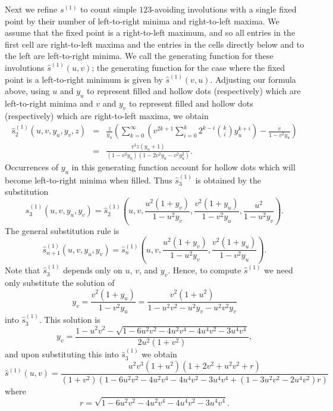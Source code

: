 \documentclass[10pt]{article}
\theoremstyle{plain}
\begin{document}
Next we refine $s^{(1)}$ to count simple $123$-avoiding involutions with a single fixed point by their number of left-to-right minima and right-to-left maxima. We assume that the fixed point is a right-to-left maximum, and so all entries in the first cell are right-to-left maxima and the entries in the cells directly below and to the left are left-to-right minima. We call the generating function for these involutions $\widehat{s}^{(1)}(u,v)$; the generating function for the case where the fixed point is a left-to-right minimum is given by $\widehat{s}^{(1)}(v,u)$. Adjusting our formula above, using $u$ and $y_u$ to represent filled and hollow dots (respectively) which are left-to-right minima and $v$ and $y_v$ to represent filled and hollow dots (respectively) which are right-to-left maxima, we obtain 
	\begin{eqnarray*}
	\widehat{s}_2^{(1)}(u,v,y_u,y_v,z)
	&=&
	\frac{z}{y_u}\left(\sum_{k=0}^\infty \left(v^{2k+1}\sum_{i=0}^k 2^{k-i}{k\choose i}y_u^{k+i}\right) - \frac{v}{1-v^2y_u}\right)\\
	&=&
	\frac{v^3z(y_u+1)}{(1-v^2y_u)(1-2v^2y_u-v^2y_u^2)}.
	\end{eqnarray*}
% 
Occurrences of $y_u$ in this generating function account for hollow dots which will become left-to-right minima when filled. Thus $\widehat{s}_3^{(1)}$ is obtained by the substitution
	\[
	\widehat{s}_3^{(1)}(u,v,y_u,y_v)
	=
	\widehat{s}_2^{(1)}\left(u,v,\frac{u^2(1+y_v)}{1-u^2y_v},\frac{v^2(1+y_u)}{1-v^2y_u},\frac{u^2}{1-u^2y_v}\right).
	\]
The general substitution rule is
	\[
	\widehat{s}_{n+1}^{(1)}(u,v,y_u,y_v)
	=
	\widehat{s}_n^{(1)}\left(u,v,\frac{u^2(1+y_v)}{1-u^2y_v},\frac{v^2(1+y_u)}{1-v^2y_u}\right).
	\]
Note that $\widehat{s}^{(1)}_3$ depends only on $u$, $v$, and $y_v$. Hence, to compute $\widehat{s}^{(1)}$ we need only substitute the solution of
	\[
	y_v
	=
	\frac{v^2(1+y_u)}{1-v^2y_u}
	=
	\frac{v^2(1+u^2)}{1-u^2v^2-u^2y_v-u^2v^2y_v}
	\]
into $\widehat{s}_3^{(1)}$. This solution is
	\[
	y_v
	=
	\frac{1-u^2v^2-\sqrt{1-6u^2v^2-4u^2v^4-4u^4v^2-3u^4v^4}}{2u^2(1+v^2)},
	\]
and upon substituting this into $\widehat{s}_3^{(1)}$ we obtain
	\[
	\widehat{s}^{(1)}(u,v)
	=
	\frac{u^2v^3(1+u^2)(1+2v^2+u^2v^2+r)}
	{(1+v^2)(1-6u^2v^2-4u^2v^4-4u^4v^2-3u^4v^4+(1-3u^2v^2-2u^4v^2)r)}
	\]
where
	\[
	r=\sqrt{1-6u^2v^2-4u^2v^4-4u^4v^2-3u^4v^4}.
	\]
\end{document}
